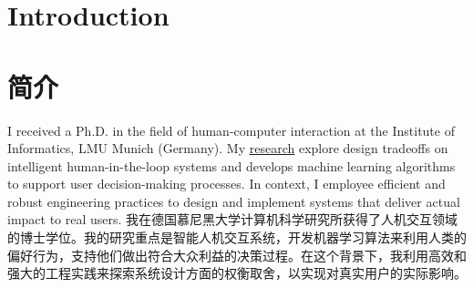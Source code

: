  {
\section{\textbf{Introduction}}
}{
\section{\textbf{简介}}
}
 {
\small
I received a Ph.D. in the field of human-computer interaction at the Institute of Informatics, LMU Munich (Germany). My \href{https://changkun.de/research}{\underline{research}} explore design tradeoffs on intelligent human-in-the-loop systems and develops machine learning algorithms to support user decision-making processes. In context, I employee efficient and robust engineering practices to design and implement systems that deliver actual impact to real users.
}{
\small
我在德国慕尼黑大学计算机科学研究所获得了人机交互领域的博士学位。我的研究重点是智能人机交互系统，开发机器学习算法来利用人类的偏好行为，支持他们做出符合大众利益的决策过程。在这个背景下，我利用高效和强大的工程实践来探索系统设计方面的权衡取舍，以实现对真实用户的实际影响。
}